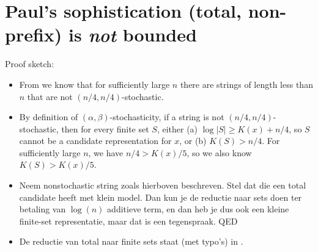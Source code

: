 \documentclass{style/llncs}
\begin{document}
\section{Paul's sophistication (total, non-prefix) is \emph{not}  bounded}

Proof sketch:

\begin{itemize}
  \item From \cite[Proposition~I.3 (b)]{gacs2001algorithmic} we know
    that for sufficiently large $n$ there are strings of length less
    than $n$ that are not $(n/4, n/4)$-stochastic.
  \item By definition of $(\alpha,\beta)$-stochasticity, if a string
    is not $(n/4,n/4)$-stochastic, then for every finite set $S$,
    either (a) $\log|S|\ge K(x)+n/4$, so $S$ cannot be a candidate
    representation for $x$, or (b) $K(S)>n/4$. For sufficiently large
    $n$, we have $n/4>K(x)/5$, so we also know $K(S)>K(x)/5$.
  \item Neem nonstochastic string zoals hierboven beschreven. Stel dat
    die een total candidate heeft met klein model. Dan kun je de
    reductie naar sets doen ter betaling van $\log(n)$ additieve term,
    en dan heb je dus ook een kleine finite-set representatie, maar
    dat is een tegenspraak. QED
  \item De reductie van total naar finite sets staat (met typo's) in
    \cite[Lemma~7.2]{vitanyi2004meaningful}. 
\end{itemize}



\end{document}
